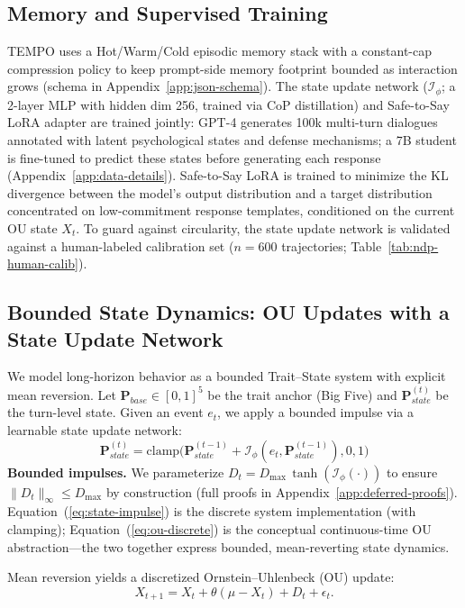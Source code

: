 \documentclass[11pt]{article}
\begin{document}
\subsection{Memory and Supervised Training}
\label{sec:supervision}
TEMPO uses a Hot/Warm/Cold episodic memory stack with a constant-cap compression policy to keep prompt-side memory footprint bounded as interaction grows (schema in Appendix~\ref{app:json-schema}).
The state update network ($\mathcal{I}_\phi$; a 2-layer MLP with hidden dim 256, trained via CoP distillation) and Safe-to-Say LoRA adapter are trained jointly: GPT-4 generates 100k multi-turn dialogues annotated with latent psychological states and defense mechanisms; a 7B student is fine-tuned to predict these states before generating each response (Appendix~\ref{app:data-details}). Safe-to-Say LoRA is trained to minimize the KL divergence between the model's output distribution and a target distribution concentrated on low-commitment response templates, conditioned on the current OU state $X_t$. To guard against circularity, the state update network is validated against a human-labeled calibration set ($n=600$ trajectories; Table~\ref{tab:ndp-human-calib}).

\subsection{Bounded State Dynamics: OU Updates with a State Update Network}
\label{sec:ou}

We model long-horizon behavior as a bounded Trait--State system with explicit mean reversion.
Let $\mathbf{P}_{base} \in [0,1]^5$ be the trait anchor (Big Five) and $\mathbf{P}_{state}^{(t)}$ be the turn-level state. Given an event $e_t$, we apply a bounded impulse via a learnable state update network:
\begin{equation}
    \mathbf{P}_{state}^{(t)} = \text{clamp}\big(\mathbf{P}_{state}^{(t-1)} + \mathcal{I}_\phi(e_t, \mathbf{P}_{state}^{(t-1)}), 0, 1\big)
    \label{eq:state-impulse}
\end{equation}
\textbf{Bounded impulses.} We parameterize $D_t = D_{\max}\,\tanh(\mathcal{I}_\phi(\cdot))$ to ensure $\|D_t\|_\infty\le D_{\max}$ by construction (full proofs in Appendix~\ref{app:deferred-proofs}). Equation~(\ref{eq:state-impulse}) is the discrete system implementation (with clamping); Equation~(\ref{eq:ou-discrete}) is the conceptual continuous-time OU abstraction---the two together express bounded, mean-reverting state dynamics.

Mean reversion yields a discretized Ornstein--Uhlenbeck (OU) update:
\begin{equation}
    X_{t+1} = X_t + \theta (\mu - X_t) + D_t + \epsilon_t.
    \label{eq:ou-discrete}
\end{equation}
\end{document}
